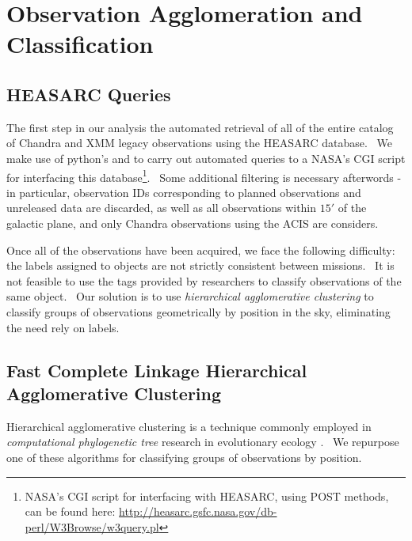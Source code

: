 \documentclass{amsart}
\newcommand{\tmtextit}[1]{{\itshape{#1}}}
\newcommand{\tmtexttt}[1]{{\ttfamily{#1}}}
\begin{document}
\section{Observation Agglomeration and Classification}\label{Agglomeration}

\subsection{HEASARC Queries\label{heasarc}\label{ACIS}}

The first step in our analysis the automated retrieval of all of the entire
catalog of Chandra and XMM legacy observations using the HEASARC database. \
We make use of python's
\href{http://docs.python.org/library/urllib.html}{\tmtexttt{urllib}} and
\href{http://docs.python.org/library/urllib2.html}{\tmtexttt{urllib2}} to
carry out automated queries to a NASA's CGI script for interfacing this
database{\footnote{NASA's CGI script for interfacing with HEASARC, using POST
methods, can be found here:
\href{http://heasarc.gsfc.nasa.gov/db-perl/W3Browse/w3query.pl}{http://heasarc.gsfc.nasa.gov/db-perl/W3Browse/w3query.pl}}}.
\ Some additional filtering is necessary afterwords - in particular,
observation IDs corresponding to planned observations and unreleased data are
discarded, as well as all observations within $15'$ of the galactic plane, and
only Chandra observations using the ACIS are considers.

Once all of the observations have been acquired, we face the following
difficulty: the labels assigned to objects are not strictly consistent between
missions. \ It is not feasible to use the tags provided by researchers to
classify observations of the same object. \ Our solution is to use
\tmtextit{hierarchical agglomerative clustering} to classify groups of
observations geometrically by position in the sky, eliminating the need rely
on labels.

\subsection{Fast Complete Linkage Hierarchical Agglomerative
Clustering\label{fastagglomeration}}

Hierarchical agglomerative clustering is a technique commonly employed in
\tmtextit{computational phylogenetic tree} research in evolutionary ecology
{\cite{press_section_2007}}. \ We repurpose one of these algorithms for
classifying groups of observations by position.
\end{document}
